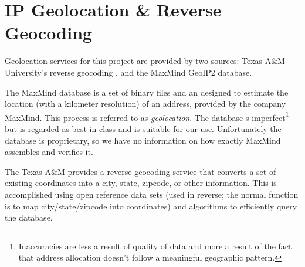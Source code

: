 \section{IP Geolocation \& Reverse Geocoding}\label{sec:background_geolocation}
Geolocation services for this project are provided by two sources: Texas A\&M University's reverse geocoding \api, and the MaxMind GeoIP2 database.

The MaxMind database is a set of binary files and an \sdk designed to estimate the location (with a  kilometer resolution) of an \ip address, provided by the company MaxMind. This process is referred to as \textit{\ip geolocation}. The database s imperfect\footnote{Inaccuracies are less a result of quality of data and more a result of the fact that \ip address allocation doesn't follow a meaningful geographic pattern.} but is regarded as best-in-class and is suitable for our use. Unfortunately the database is proprietary, so we have no information on how exactly MaxMind assembles and verifies it.

The Texas A\&M \api provides a reverse geocoding service that converts a set of existing coordinates into a city, state, zipcode, or other information. This is accomplished using open reference data sets (used in reverse; the normal function is to map city/state/zipcode into coordinates) and algorithms to efficiently query the database.
